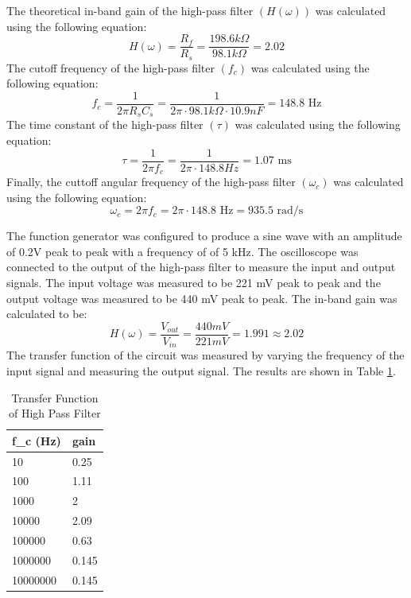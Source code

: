 \documentclass[12pt]{article}
\begin{document}
The theoretical in-band gain of the high-pass filter $(H(\omega))$ was
calculated using the following equation:
\[
  H(\omega) = \frac{R_f}{R_s} = \frac{198.6 k\Omega}{98.1 k\Omega} = 2.02
\]
The cutoff frequency of the high-pass filter $(f_c)$ was calculated using the following equation:
\[
  f_c = \frac{1}{2\pi R_s C_s} = \frac{1}{2\pi \cdot 98.1 k\Omega \cdot 10.9 nF} = 148.8 \text{ Hz}
\]
The time constant of the high-pass filter $(\tau)$ was calculated
using the following equation:
\[
  \tau = \frac{1}{2 \pi f_c} = \frac{1}{2 \pi \cdot 148.8 Hz} = 1.07 \text{ ms}
\]
Finally, the cuttoff angular frequency of the high-pass filter $(\omega_c)$ was calculated using the
following equation:
\[
  \omega_c = 2 \pi f_c = 2 \pi \cdot 148.8 \text{ Hz} = 935.5 \text{ rad/s}
\]

The function generator was configured to produce a sine wave with an amplitude of 0.2V peak to peak
with a frequency of of 5 kHz.
The oscilloscope was connected to the output of the high-pass filter to measure the input and
output signals. The input voltage was measured to be 221 mV peak to peak and the output voltage was
measured to be 440 mV peak to peak. The in-band gain was calculated to be:
\[
  H(\omega) = \frac{V_{out}}{V_{in}} = \frac{440 mV}{221 mV} = 1.991 \approx 2.02
\]
The transfer function of the circuit was measured by varying the frequency of the input signal
and measuring the output signal. The results are shown in Table \ref{tab:transferfunction}.
\begin{table}[H]
  \centering
  \begin{tabular}{|l|l|}
    \hline
    f\_c (Hz) & gain  \\ \hline
    10        & 0.25  \\ \hline
    100       & 1.11  \\ \hline
    1000      & 2     \\ \hline
    10000     & 2.09  \\ \hline
    100000    & 0.63  \\ \hline
    1000000   & 0.145 \\ \hline
    10000000  & 0.145 \\ \hline
  \end{tabular}
  \caption{Transfer Function of High Pass Filter}
  \label{tab:transferfunction}
\end{table}
\end{document}
